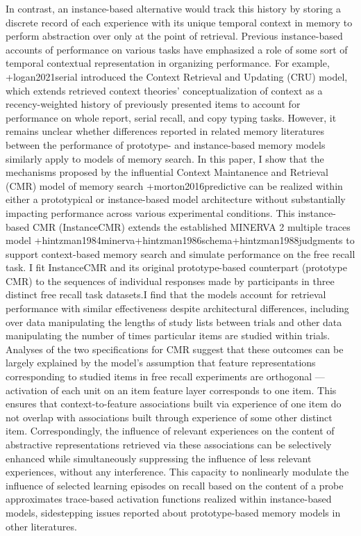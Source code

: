 {}In contrast, an instance-based alternative would track this history by storing a discrete record of each experience with its unique temporal context in memory to perform abstraction over only at the point of retrieval. Previous instance-based accounts of performance on various tasks have emphasized a role of some sort of temporal contextual representation in organizing performance. For example, +{}{}{logan2021serial} introduced the Context Retrieval and Updating (CRU) model, which extends retrieved context theories' conceptualization of context as a recency-weighted history of previously presented items to account for performance on whole report, serial recall, and copy typing tasks. However, it remains unclear whether differences reported in related memory literatures between the performance of prototype- and instance-based memory models similarly apply to models of memory search.\markdownRendererInterblockSeparator
{}In this paper, I show that the mechanisms proposed by the influential Context Maintanence and Retrieval (CMR) model of memory search +{}{}{morton2016predictive} can be realized within either a prototypical or instance-based model architecture without substantially impacting performance across various experimental conditions. This instance-based CMR (InstanceCMR) extends the established MINERVA 2 multiple traces model +{}{}{hintzman1984minerva}+{}{}{hintzman1986schema}+{}{}{hintzman1988judgments} to support context-based memory search and simulate performance on the free recall task. I fit InstanceCMR and its original prototype-based counterpart (prototype CMR) to the sequences of individual responses made by participants in three distinct free recall task datasets.I find that the models account for retrieval performance with similar effectiveness despite architectural differences, including over data manipulating the lengths of study lists between trials and other data manipulating the number of times particular items are studied within trials. \markdownRendererInterblockSeparator
{}Analyses of the two specifications for CMR suggest that these outcomes can be largely explained by the model's assumption that feature representations corresponding to studied items in free recall experiments are orthogonal --- activation of each unit on an item feature layer corresponds to one item. This ensures that context-to-feature associations built via experience of one item do not overlap with associations built through experience of some other distinct item. Correspondingly, the influence of relevant experiences on the content of abstractive representations retrieved via these associations can be selectively enhanced while simultaneously suppressing the influence of less relevant experiences, without any interference. This capacity to nonlinearly modulate the influence of selected learning episodes on recall based on the content of a probe approximates trace-based activation functions realized within instance-based models, sidestepping issues reported about prototype-based memory models in other literatures.\relax